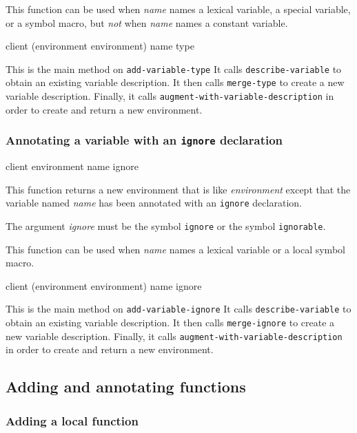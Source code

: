 This function can be used when \textit{name} names a lexical variable,
a special variable, or a symbol macro, but \emph{not}
when \textit{name} names a constant variable.

{\footnotesize
{}
{client
 (environment environment)
 name
 type}
}

This is the main method on \texttt{add-variable-type} It
calls \texttt{describe-variable} to obtain an existing variable
description.  It then calls \texttt{merge-type} to create a new
variable description.  Finally, it calls
\texttt{augment-with-variable-description} in order to create and
return a new environment.

\subsubsection{Annotating a variable with an \texttt{ignore} declaration}
\label{sec-annotating-a-variable-with-ignore}

{\footnotesize
{} {client environment name ignore}
}

This function returns a new environment that is like
\textit{environment} except that the variable named \textit{name} has
been annotated with an \texttt{ignore} declaration.

The argument \textit{ignore} must be the symbol \texttt{ignore} or the
symbol \texttt{ignorable}.

This function can be used when \textit{name} names a lexical variable
or a local symbol macro.

{\footnotesize
{}
{client
 (environment environment)
 name
 ignore}
}

This is the main method on \texttt{add-variable-ignore} It
calls \texttt{describe-variable} to obtain an existing variable
description.  It then calls \texttt{merge-ignore} to create a new
variable description.  Finally, it calls
\texttt{augment-with-variable-description} in order to create and
return a new environment.

\subsection{Adding and annotating functions}

\subsubsection{Adding a local function}

